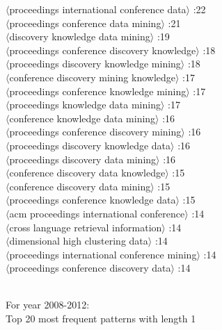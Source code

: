 \documentclass[11pt,a4paper,fleqn]{article}
\begin{document}
\begin{multicols}{2} \noindent
$\langle$proceedings international conference data$\rangle$ :22\\
$\langle$proceedings conference data mining$\rangle$ :21\\
$\langle$discovery knowledge data mining$\rangle$ :19\\
$\langle$proceedings conference discovery knowledge$\rangle$ :18\\
$\langle$proceedings discovery knowledge mining$\rangle$ :18\\
$\langle$conference discovery mining knowledge$\rangle$ :17\\
$\langle$proceedings conference knowledge mining$\rangle$ :17\\
$\langle$proceedings knowledge data mining$\rangle$ :17\\
$\langle$conference knowledge data mining$\rangle$ :16\\
$\langle$proceedings conference discovery mining$\rangle$ :16\\
$\langle$proceedings discovery knowledge data$\rangle$ :16\\
$\langle$proceedings discovery data mining$\rangle$ :16\\
$\langle$conference discovery data knowledge$\rangle$ :15\\
$\langle$conference discovery data mining$\rangle$ :15\\
$\langle$proceedings conference knowledge data$\rangle$ :15\\
$\langle$acm proceedings international conference$\rangle$ :14\\
$\langle$cross language retrieval information$\rangle$ :14\\
$\langle$dimensional high clustering data$\rangle$ :14\\
$\langle$proceedings international conference mining$\rangle$ :14\\
$\langle$proceedings conference discovery data$\rangle$ :14\\
\end{multicols} \noindent \\
For year 2008-2012:\\
Top 20 most frequent patterns with length 1
\end{document}
